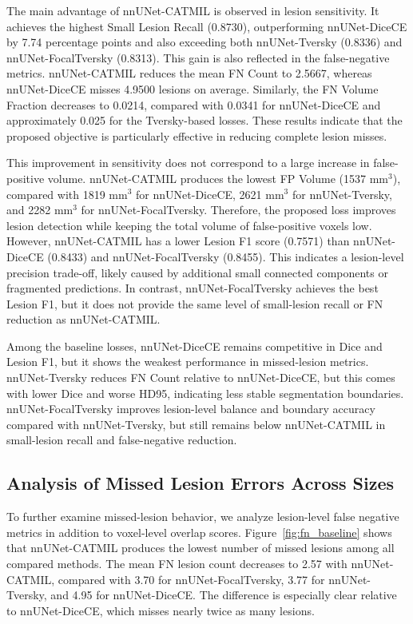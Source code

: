 The main advantage of nnUNet-CATMIL is observed in lesion sensitivity.
It achieves the highest Small Lesion Recall (0.8730), outperforming
nnUNet-DiceCE by 7.74 percentage points and also exceeding both
nnUNet-Tversky (0.8336) and nnUNet-FocalTversky (0.8313). This gain is
also reflected in the false-negative metrics. nnUNet-CATMIL reduces the
mean FN Count to 2.5667, whereas nnUNet-DiceCE misses 4.9500 lesions on
average. Similarly, the FN Volume Fraction decreases to 0.0214, compared
with 0.0341 for nnUNet-DiceCE and approximately 0.025 for the
Tversky-based losses. These results indicate that the proposed objective
is particularly effective in reducing complete lesion misses.

This improvement in sensitivity does not correspond to a large increase
in false-positive volume. nnUNet-CATMIL produces the lowest FP Volume
(1537 mm$^3$), compared with 1819 mm$^3$ for nnUNet-DiceCE,
2621 mm$^3$ for nnUNet-Tversky, and 2282 mm$^3$ for
nnUNet-FocalTversky. Therefore, the proposed loss improves lesion
detection while keeping the total volume of false-positive voxels low.
However, nnUNet-CATMIL has a lower Lesion F1 score (0.7571) than
nnUNet-DiceCE (0.8433) and nnUNet-FocalTversky (0.8455). This indicates
a lesion-level precision trade-off, likely caused by additional small
connected components or fragmented predictions. In contrast,
nnUNet-FocalTversky achieves the best Lesion F1, but it does not provide
the same level of small-lesion recall or FN reduction as nnUNet-CATMIL.

Among the baseline losses, nnUNet-DiceCE remains competitive in Dice and
Lesion F1, but it shows the weakest performance in missed-lesion metrics.
nnUNet-Tversky reduces FN Count relative to nnUNet-DiceCE, but this comes
with lower Dice and worse HD95, indicating less stable segmentation
boundaries. nnUNet-FocalTversky improves lesion-level balance and
boundary accuracy compared with nnUNet-Tversky, but still remains below
nnUNet-CATMIL in small-lesion recall and false-negative reduction.


\subsection{Analysis of Missed Lesion Errors Across Sizes}

To further examine missed-lesion behavior, we analyze lesion-level false
negative metrics in addition to voxel-level overlap scores.
Figure~\ref{fig:fn_baseline} shows that nnUNet-CATMIL produces the lowest
number of missed lesions among all compared methods. The mean FN lesion
count decreases to 2.57 with nnUNet-CATMIL, compared with 3.70 for
nnUNet-FocalTversky, 3.77 for nnUNet-Tversky, and 4.95 for
nnUNet-DiceCE. The difference is especially clear relative to
nnUNet-DiceCE, which misses nearly twice as many lesions.

